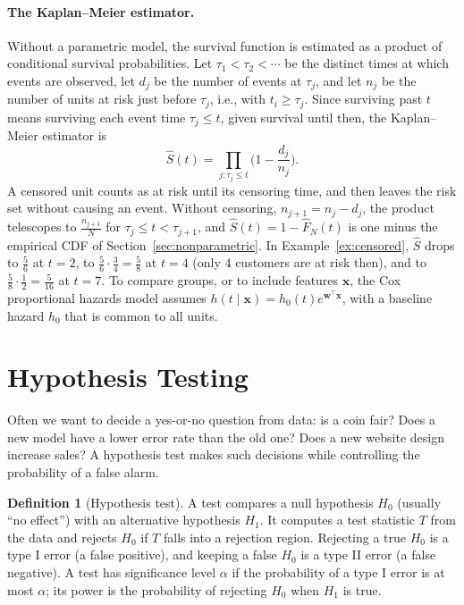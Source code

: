 \documentclass[11pt]{article}
\theoremstyle{definition}
\newtheorem{definition}{Definition}[section]
\theoremstyle{plain}
\theoremstyle{remark}
\begin{document}
\paragraph{The Kaplan--Meier estimator.} Without a parametric model, the survival function is estimated as a product of conditional survival probabilities. Let $\tau_1 < \tau_2 < \cdots$ be the distinct times at which events are observed, let $d_j$ be the number of events at $\tau_j$, and let $n_j$ be the number of units at risk just before $\tau_j$, i.e., with $t_i \geq \tau_j$. Since surviving past $t$ means surviving each event time $\tau_j \leq t$, given survival until then, the Kaplan--Meier estimator is
\[\hat S(t) = \prod_{j : \tau_j \leq t}\Big(1 - \frac{d_j}{n_j}\Big).\]
A censored unit counts as at risk until its censoring time, and then leaves the risk set without causing an event. Without censoring, $n_{j+1} = n_j - d_j$, the product telescopes to $\frac{n_{j+1}}{N}$ for $\tau_j \leq t < \tau_{j+1}$, and $\hat S(t) = 1 - \hat F_N(t)$ is one minus the empirical CDF of Section~\ref{sec:nonparametric}. In Example~\ref{ex:censored}, $\hat S$ drops to $\frac{5}{6}$ at $t = 2$, to $\frac{5}{6} \cdot \frac{3}{4} = \frac{5}{8}$ at $t = 4$ (only $4$ customers are at risk then), and to $\frac{5}{8} \cdot \frac{1}{2} = \frac{5}{16}$ at $t = 7$. To compare groups, or to include features $\mathbf{x}$, the Cox proportional hazards model assumes $h(t \mid \mathbf{x}) = h_0(t)e^{\mathbf{w}^\top\mathbf{x}}$, with a baseline hazard $h_0$ that is common to all units.

\section{Hypothesis Testing}\label{sec:testing}

Often we want to decide a yes-or-no question from data: is a coin fair? Does a new model have a lower error rate than the old one? Does a new website design increase sales? A hypothesis test makes such decisions while controlling the probability of a false alarm.

\begin{definition}[Hypothesis test]\label{def:test}
    A test compares a null hypothesis $H_0$ (usually ``no effect'') with an alternative hypothesis $H_1$. It computes a test statistic $T$ from the data and rejects $H_0$ if $T$ falls into a rejection region. Rejecting a true $H_0$ is a type I error (a false positive), and keeping a false $H_0$ is a type II error (a false negative). A test has significance level $\alpha$ if the probability of a type I error is at most $\alpha$; its power is the probability of rejecting $H_0$ when $H_1$ is true.
\end{definition}
\end{document}
